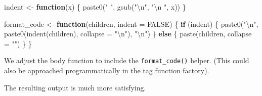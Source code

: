 \documentclass[
]{krantz}
\makeatletter
\newenvironment{Shaded}{\begin{snugshade}}{\end{snugshade}}
\newcommand{\CharTok}[1]{\textcolor[rgb]{0.31,0.60,0.02}{#1}}
\newcommand{\ControlFlowTok}[1]{\textcolor[rgb]{0.13,0.29,0.53}{\textbf{#1}}}
\newcommand{\DataTypeTok}[1]{\textcolor[rgb]{0.13,0.29,0.53}{#1}}
\newcommand{\KeywordTok}[1]{\textcolor[rgb]{0.13,0.29,0.53}{\textbf{#1}}}
\newcommand{\NormalTok}[1]{#1}
\newcommand{\OperatorTok}[1]{\textcolor[rgb]{0.81,0.36,0.00}{\textbf{#1}}}
\newcommand{\OtherTok}[1]{\textcolor[rgb]{0.56,0.35,0.01}{#1}}
\newcommand{\StringTok}[1]{\textcolor[rgb]{0.31,0.60,0.02}{#1}}
\newenvironment{kframe}{%
\medskip{}
\setlength{\fboxsep}{.8em}
 \def\at@end@of@kframe{}%
 \ifinner\ifhmode%
  \def\at@end@of@kframe{\end{minipage}}%
  \begin{minipage}{\columnwidth}%
 \fi\fi%
 \def\FrameCommand##1{\hskip\@totalleftmargin \hskip-\fboxsep
 \colorbox{shadecolor}{##1}\hskip-\fboxsep
     \hskip-\linewidth \hskip-\@totalleftmargin \hskip\columnwidth}%
 \MakeFramed {\advance\hsize-\width
   \@totalleftmargin\z@ \linewidth\hsize
   \@setminipage}}%
 {\par\unskip\endMakeFramed%
 \at@end@of@kframe}
\renewenvironment{Shaded}{\begin{kframe}}{\end{kframe}}
\renewcommand{\KeywordTok} [1]{\textcolor[rgb]{0.00,0.44,0.13}{{#1}}}
\renewcommand{\DataTypeTok}[1]{\textcolor[rgb]{0.56,0.13,0.00}{{#1}}}
\renewcommand{\CharTok}    [1]{\textcolor[rgb]{0.25,0.44,0.63}{{#1}}}
\renewcommand{\StringTok}  [1]{\textcolor[rgb]{0.25,0.44,0.63}{{#1}}}
\renewcommand{\OtherTok}   [1]{\textcolor[rgb]{0.00,0.44,0.13}{{#1}}}
\renewcommand{\NormalTok}  [1]{{#1}}
\makeatother
\begin{document}
\begin{Shaded}
\begin{Highlighting}[]
\NormalTok{indent <-}\StringTok{ }\ControlFlowTok{function}\NormalTok{(x) \{}
  \KeywordTok{paste0}\NormalTok{(}\StringTok{"  "}\NormalTok{, }\KeywordTok{gsub}\NormalTok{(}\StringTok{"}\CharTok{\textbackslash{}n}\StringTok{"}\NormalTok{, }\StringTok{"}\CharTok{\textbackslash{}n}\StringTok{  "}\NormalTok{, x))}
\NormalTok{\}}

\NormalTok{format_code <-}\StringTok{ }\ControlFlowTok{function}\NormalTok{(children, }\DataTypeTok{indent =} \OtherTok{FALSE}\NormalTok{) \{}
  \ControlFlowTok{if}\NormalTok{ (indent) \{}
    \KeywordTok{paste0}\NormalTok{(}\StringTok{"}\CharTok{\textbackslash{}n}\StringTok{"}\NormalTok{, }\KeywordTok{paste0}\NormalTok{(}\KeywordTok{indent}\NormalTok{(children), }\DataTypeTok{collapse =} \StringTok{"}\CharTok{\textbackslash{}n}\StringTok{"}\NormalTok{), }\StringTok{"}\CharTok{\textbackslash{}n}\StringTok{"}\NormalTok{)}
\NormalTok{  \} }\ControlFlowTok{else}\NormalTok{ \{}
    \KeywordTok{paste}\NormalTok{(children, }\DataTypeTok{collapse =} \StringTok{""}\NormalTok{) }
\NormalTok{  \}}
\NormalTok{\}}
\end{Highlighting}
\end{Shaded}

We adjust the body function to include the \texttt{format\_code()} helper. (This could also be approached programmatically in the tag function factory).

\begin{Shaded}
\end{Shaded}

The resulting output is much more satisfying.
\end{document}
